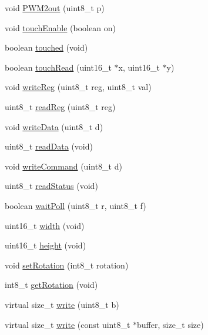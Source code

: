 \begin{DoxyCompactItemize}
\item 
void \mbox{\hyperlink{class_adafruit___r_a8875_aaabcf8278287f64c28112fb976335c26}{P\+W\+M2out}} (uint8\+\_\+t p)
\item 
void \mbox{\hyperlink{class_adafruit___r_a8875_a16c340772d8f313e1ec937058b6dbdd7}{touch\+Enable}} (boolean on)
\item 
boolean \mbox{\hyperlink{class_adafruit___r_a8875_ac5d283dee07e8da46e71a1de1394d1c3}{touched}} (void)
\item 
boolean \mbox{\hyperlink{class_adafruit___r_a8875_a04a9dc3c75a81429b27630470da8f95d}{touch\+Read}} (uint16\+\_\+t $\ast$x, uint16\+\_\+t $\ast$y)
\item 
void \mbox{\hyperlink{class_adafruit___r_a8875_a2e6a3f2fd43716ddb5c279e0a456369f}{write\+Reg}} (uint8\+\_\+t reg, uint8\+\_\+t val)
\item 
uint8\+\_\+t \mbox{\hyperlink{class_adafruit___r_a8875_acff25414ab909c1c2dc7b5bf505fb2cf}{read\+Reg}} (uint8\+\_\+t reg)
\item 
void \mbox{\hyperlink{class_adafruit___r_a8875_ada2fe2eaba6203691b422c0f561c8a94}{write\+Data}} (uint8\+\_\+t d)
\item 
uint8\+\_\+t \mbox{\hyperlink{class_adafruit___r_a8875_a7771753841f0390793b69421ef86ffb6}{read\+Data}} (void)
\item 
void \mbox{\hyperlink{class_adafruit___r_a8875_a65c88e13691db0d8cae5b5e32883268e}{write\+Command}} (uint8\+\_\+t d)
\item 
uint8\+\_\+t \mbox{\hyperlink{class_adafruit___r_a8875_a6bc685b64b6cce6480af2054e7cabc14}{read\+Status}} (void)
\item 
boolean \mbox{\hyperlink{class_adafruit___r_a8875_ad926379389b044ab1aca6a3d4e2c5afd}{wait\+Poll}} (uint8\+\_\+t r, uint8\+\_\+t f)
\item 
uint16\+\_\+t \mbox{\hyperlink{class_adafruit___r_a8875_ad305a724603e1030ec1bfe1a67327ed5}{width}} (void)
\item 
uint16\+\_\+t \mbox{\hyperlink{class_adafruit___r_a8875_a9f694201aec288b75ace7751b5a9f458}{height}} (void)
\item 
void \mbox{\hyperlink{class_adafruit___r_a8875_ae63649355c69e89318a1fbaf201bcdf5}{set\+Rotation}} (int8\+\_\+t rotation)
\item 
int8\+\_\+t \mbox{\hyperlink{class_adafruit___r_a8875_ab1d33b473a9c918edb06c15f8ace9f8a}{get\+Rotation}} (void)
\item 
virtual size\+\_\+t \mbox{\hyperlink{class_adafruit___r_a8875_a66a7c8f7f836c67d3f0952b94a3e420c}{write}} (uint8\+\_\+t b)
\item 
virtual size\+\_\+t \mbox{\hyperlink{class_adafruit___r_a8875_a0956b49201ae4618a9a20d828f3815b1}{write}} (const uint8\+\_\+t $\ast$buffer, size\+\_\+t size)
\end{DoxyCompactItemize}


